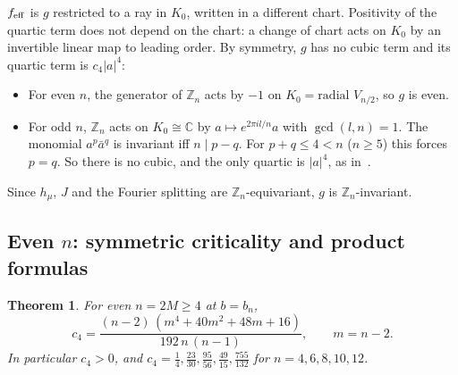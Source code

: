 \documentclass[11pt]{article}
\newtheorem{theorem}{Theorem}
\theoremstyle{definition}
\theoremstyle{remark}
\newcommand{\C}{\mathbb{C}}
\newcommand{\Z}{\mathbb{Z}}
\begin{document}
\noindent
$f_{\rm eff}$ is $g$ restricted to a ray in $K_0$, written in a different chart. Positivity of the quartic
term does not depend on the chart: a change of chart acts on $K_0$ by an invertible linear map to leading
order. By symmetry, $g$ has no cubic term and its quartic term is $c_4|a|^4$:
\begin{itemize}
\item For even $n$, the generator of $\Z_n$ acts by $-1$ on $K_0=\text{radial }V_{n/2}$, so $g$ is even.
\item For odd $n$, $\Z_n$ acts on $K_0\cong\C$ by $a\mapsto e^{2\pi il/n}a$ with $\gcd(l,n)=1$. The
monomial $a^p\bar a^q$ is invariant iff $n\mid p-q$. For $p+q\le4<n$ ($n\ge5$) this forces $p=q$. So there
is no cubic, and the only quartic is $|a|^4$, as in~\cite[Prop.~12]{MT}.
\end{itemize}
Since $h_\mu$, $J$ and the Fourier splitting are $\Z_n$-equivariant, $g$ is $\Z_n$-invariant.

\subsection{Even $n$: symmetric criticality and product formulas}

\begin{theorem}\label{thm:even}
For even $n=2M\ge4$ at $b=b_n$,
\[
c_4=\frac{(n-2)\,(m^4+40m^2+48m+16)}{192\,n\,(n-1)},\qquad m=n-2 .
\]
In particular $c_4>0$, and $c_4=\tfrac14,\tfrac{23}{30},\tfrac{95}{56},\tfrac{49}{15},\tfrac{755}{132}$ for
$n=4,6,8,10,12$.
\end{theorem}
\end{document}
